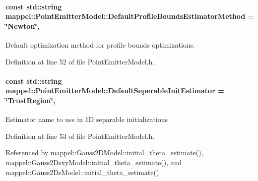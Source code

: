 \paragraph[{\texorpdfstring{Default\+Profile\+Bounds\+Estimator\+Method}{DefaultProfileBoundsEstimatorMethod}}]{\setlength{\rightskip}{0pt plus 5cm}const std\+::string mappel\+::\+Point\+Emitter\+Model\+::\+Default\+Profile\+Bounds\+Estimator\+Method = \char`\"{}Newton\char`\"{}\hspace{0.3cm}{\ttfamily [static]}, {\ttfamily [inherited]}}\hypertarget{classmappel_1_1PointEmitterModel_a5240568f2d7c7bad84e900d283b299dc}{}\label{classmappel_1_1PointEmitterModel_a5240568f2d7c7bad84e900d283b299dc}


Default optimization method for profile bounds optimizations. 



Definition at line 52 of file Point\+Emitter\+Model.\+h.

\paragraph[{\texorpdfstring{Default\+Seperable\+Init\+Estimator}{DefaultSeperableInitEstimator}}]{\setlength{\rightskip}{0pt plus 5cm}const std\+::string mappel\+::\+Point\+Emitter\+Model\+::\+Default\+Seperable\+Init\+Estimator = \char`\"{}Trust\+Region\char`\"{}\hspace{0.3cm}{\ttfamily [static]}, {\ttfamily [inherited]}}\hypertarget{classmappel_1_1PointEmitterModel_ad8c3dc629d75d22f25855a5f1ba8729f}{}\label{classmappel_1_1PointEmitterModel_ad8c3dc629d75d22f25855a5f1ba8729f}
Estimator name to use in 1D separable initializations 

Definition at line 53 of file Point\+Emitter\+Model.\+h.



Referenced by mappel\+::\+Gauss2\+D\+Model\+::initial\+\_\+theta\+\_\+estimate(), mappel\+::\+Gauss2\+Dsxy\+Model\+::initial\+\_\+theta\+\_\+estimate(), and mappel\+::\+Gauss2\+Ds\+Model\+::initial\+\_\+theta\+\_\+estimate().

